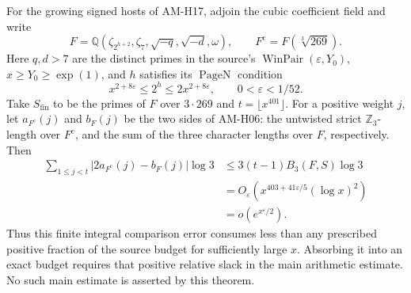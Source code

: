 \begin{theorem}
For the growing signed hosts of AM-H17, adjoin the cubic
coefficient field and write
\[
 F=\mathbb Q(\zeta_{2^{h+2}},\zeta_7,
               \sqrt{-q},\sqrt{-d},\omega),
 \qquad F^{\mathrm c}=F(\sqrt[3]{269}).          \tag{FG.3}
\]
Here $q,d>7$ are the distinct primes in the source's
$\operatorname{WinPair}(\varepsilon,Y_0)$, $x\geq Y_0\geq\exp(1)$,
and $h$ satisfies its $\operatorname{PageN}$ condition
\[
 x^{2+8\varepsilon}\leq2^h\leq2x^{2+8\varepsilon},
 \qquad 0<\varepsilon<1/52.
\]
Take $S_{\mathrm{fin}}$ to be the primes of $F$ over
$3\cdot269$ and $t=\lfloor x^{401}\rfloor$.
For a positive weight $j$, let $a_{F^{\mathrm c}}(j)$
and $b_F(j)$ be the two sides of AM-H06: the untwisted
strict $\mathbb Z_3$-length over $F^{\mathrm c}$, and the
sum of the three character lengths over $F$, respectively.
Then
\[
 \begin{split}
 \sum_{1\leq j<t}|2a_{F^{\mathrm c}}(j)-b_F(j)|\log3
 &\leq3(t-1)B_3(F,S)\log3\\
 &=O_\varepsilon\!\left(
 x^{403+41\varepsilon/5}(\log x)^2\right)\\
 &=o\!\left(e^{x^\varepsilon/2}\right).
 \end{split}
 \tag{FG.4}
\]
Thus this finite integral comparison error consumes less
than any prescribed positive fraction of the source budget
for sufficiently large $x$.  Absorbing it into an exact
budget requires that positive relative slack in the
main arithmetic estimate.  No such main estimate is
asserted by this theorem.
\end{theorem}

